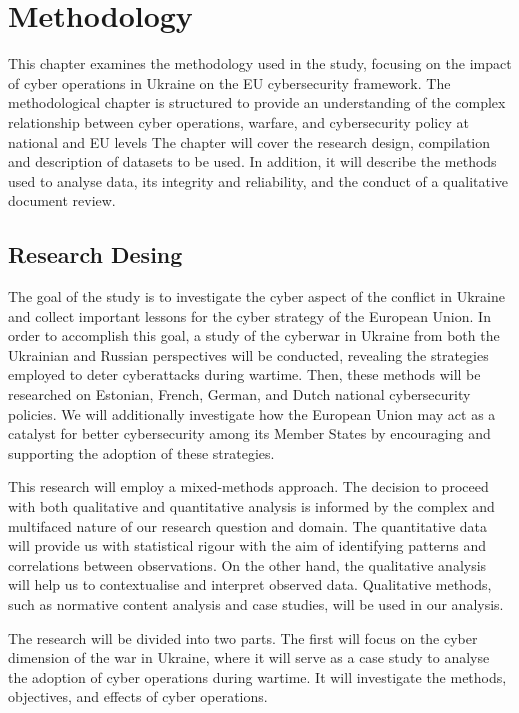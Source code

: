 \chapter{Methodology}

This chapter examines the methodology used in the study, focusing on the impact of cyber operations in Ukraine on the EU cybersecurity framework. The methodological chapter is structured to provide an understanding of the complex relationship between cyber operations, warfare, and cybersecurity policy at national and EU levels The chapter will cover the research design, compilation and description of datasets to be used. In addition, it will describe the methods used to analyse data, its integrity and reliability, and the conduct of a qualitative document review.

\section{Research Desing}

The goal of the study is to investigate the cyber aspect of the conflict in Ukraine and collect important lessons for the cyber strategy of the European Union. In order to accomplish this goal, a study of the cyberwar in Ukraine from both the Ukrainian and Russian perspectives will be conducted, revealing the strategies employed to deter cyberattacks during wartime. Then, these methods will be researched on Estonian, French, German, and Dutch national cybersecurity policies. We will additionally investigate how the European Union may act as a catalyst for better cybersecurity among its Member States by encouraging and supporting the adoption of these strategies.

This research will employ a mixed-methods approach. The decision to proceed with both qualitative and quantitative analysis is informed by the complex and multifaced nature of our research question and domain. The quantitative data will provide us with statistical rigour with the aim of identifying patterns and correlations between observations. On the other hand, the qualitative analysis will help us to contextualise and interpret observed data. Qualitative methods, such as normative content analysis and case studies, will be used in our analysis. 

The research will be divided into two parts. The first will focus on the cyber dimension of the war in Ukraine, where it will serve as a case study to analyse the adoption of cyber operations during wartime. It will investigate the methods, objectives, and effects of cyber operations.  

